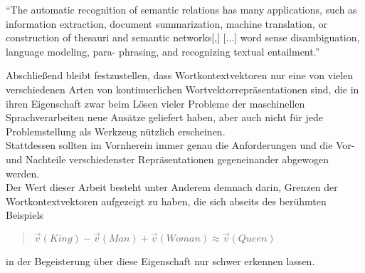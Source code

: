 \begin{itquote}
    ``The automatic recognition of semantic relations has many applications, such as information extraction,
    document summarization, machine translation, or construction of thesauri and semantic networks[,] [...]
    word sense disambiguation, language modeling, para- phrasing, and recognizing textual entailment.''
\end{itquote}

Abschließend bleibt festzustellen, dass Wortkontextvektoren nur eine von vielen verschiedenen Arten von kontinuerlichen
Wortvektorrepräsentationen sind, die in ihren Eigenschaft zwar beim Lösen vieler Probleme der maschinellen Sprachverarbeiten
neue Ansätze geliefert haben, aber auch nicht für jede Problemstellung als Werkzeug nützlich erscheinen.\\
Stattdessen sollten im Vornherein immer genau die Anforderungen und die Vor- und Nachteile verschiedenster Repräsentationen
gegeneinander abgewogen werden.\\

Der Wert dieser Arbeit besteht unter Anderem demnach darin, Grenzen der Wortkontextvektoren aufgezeigt zu haben, die sich abseits
des berühmten Beispiels

\begin{quote}
  $\vec{v}(King) - \vec{v}(Man) + \vec{v}(Woman) \approx \vec{v}(Queen)$
\end{quote}

in der Begeisterung über diese Eigenschaft nur schwer erkennen lassen.

